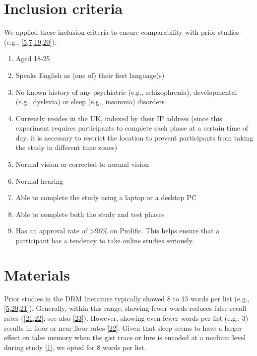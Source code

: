 \documentclass[
]{article}
\begin{document}
\hypertarget{inclusion-criteria}{%
\section{Inclusion criteria}\label{inclusion-criteria}}

We applied these inclusion criteria to ensure comparability with prior studies (e.g., {[}\protect\hyperlink{ref-fenn2009a}{5},\protect\hyperlink{ref-payne2009a}{7},\protect\hyperlink{ref-mckeon2012a}{19},\protect\hyperlink{ref-shaw2017a}{20}{]}):

\begin{enumerate}
\def\labelenumi{\arabic{enumi}.}
\item
  Aged 18-25
\item
  Speaks English as (one of) their first language(s)
\item
  No known history of any psychiatric (e.g., schizophrenia), developmental (e.g., dyslexia) or sleep (e.g., insomnia) disorders
\item
  Currently resides in the UK, indexed by their IP address (since this experiment requires participants to complete each phase at a certain time of day, it is necessary to restrict the location to prevent participants from taking the study in different time zones)
\item
  Normal vision or corrected-to-normal vision
\item
  Normal hearing
\item
  Able to complete the study using a laptop or a desktop PC
\item
  Able to complete both the study and test phases
\item
  Has an approval rate of \textgreater96\% on Prolific. This helps ensure that a participant has a tendency to take online studies seriously.
\end{enumerate}

\hypertarget{materials}{%
\section{Materials}\label{materials}}

Prior studies in the DRM literature typically showed 8 to 15 words per list (e.g., {[}\protect\hyperlink{ref-fenn2009a}{5},\protect\hyperlink{ref-shaw2017a}{20},\protect\hyperlink{ref-swannell2013a}{21}{]}). Generally, within this range, showing fewer words reduces false recall rates ({[}\protect\hyperlink{ref-swannell2013a}{21},\protect\hyperlink{ref-robinson1997a}{22}{]}; see also {[}\protect\hyperlink{ref-alakbarova2021a}{23}{]}). However, showing even fewer words per list (e.g., 3) results in floor or near-floor rates {[}\protect\hyperlink{ref-robinson1997a}{22}{]}. Given that sleep seems to have a larger effect on false memory when the gist trace or lure is encoded at a medium level during study {[}\protect\hyperlink{ref-newbury2019a}{1}{]}, we opted for 8 words per list.
\end{document}
